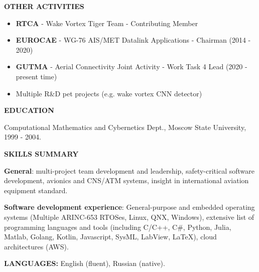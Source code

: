 \documentclass[a4paper]{article}
\begin{document}
    \textbf{OTHER ACTIVITIES}

	\begin{itemize}
	    \item \textbf{RTCA} - Wake Vortex Tiger Team - Contributing Member
	    \item \textbf{EUROCAE} - WG-76 AIS/MET Datalink Applications - Chairman (2014 - 2020)
	    \item \textbf{GUTMA} - Aerial Connectivity Joint Activity - Work Task 4 Lead (2020 - present time)
	    \item Multiple R\&D pet projects (e.g. wake vortex CNN detector)
    \end{itemize}
    \vspace{3mm}
    
    \textbf{EDUCATION}
    \vspace{3mm}
    
    Computational Mathematics and Cybernetics Dept., Moscow State University, 1999 - 2004.
    \vspace{3mm}
    
    \textbf{SKILLS SUMMARY}
    \vspace{3mm}
    
    \textbf{General}: multi-project team development and leadership, safety-critical software development, avionics and CNS/ATM systems, insight in international aviation equipment standard.
    \vspace{3mm}
    
    \textbf{Software development experience}: General-purpose and embedded operating systems (Multiple ARINC-653 RTOSes, Linux, QNX, Windows), extensive list of programming languages and tools (including C/C++, C\#, Python, Julia, Matlab, Golang, Kotlin, Javascript, SysML, LabView, LaTeX), cloud architectures (AWS).
    \vspace{5mm}
    
    \textbf{LANGUAGES:} English (fluent), Russian (native).
\end{document}

